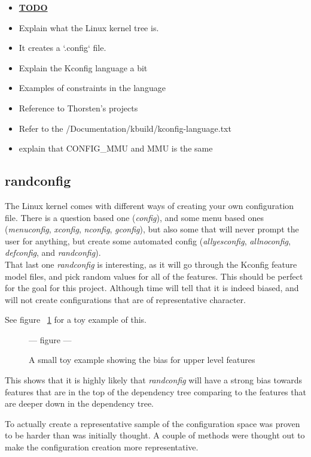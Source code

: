 \documentclass[a4paper,11pt]{article}
\newcommand{\figa}{
    \begin{figure}[!htpb]
    \centering
}
\newcommand{\figb}[2]{
    \caption{#1}
    \label{#2}
    \end{figure}
}
\begin{document}
\begin{itemize}
    \item \underline{\textbf{TODO}}
    \item Explain what the Linux kernel tree is.
    \item It creates a `.config` file.
    \item Explain the Kconfig language a bit
    \item Examples of constraints in the language
    \item Reference to Thorsten's projects
    \item Refer to the /Documentation/kbuild/kconfig-language.txt
    \item explain that CONFIG\_MMU and MMU is the same
\end{itemize}

\subsection{randconfig}

The Linux kernel comes with different ways of creating your own configuration 
file. There is a question based one (\emph{config}), and some menu based ones 
(\emph{menuconfig}, \emph{xconfig}, \emph{nconfig}, \emph{gconfig}), but also 
some that will never prompt the user for anything, but create some automated 
config (\emph{allyesconfig}, \emph{allnoconfig}, \emph{defconfig}, and 
\emph{randconfig}).
\\

That last one \emph{randconfig} is interesting, as it will go through the 
Kconfig feature model files, and pick random values for all of the features. 
This should be perfect for the goal for this project. Although time will tell 
that it is indeed biased, and will not create configurations that are of 
representative character. 

See figure ~\ref{randconfigtoy} for a toy example of this.

\figa
    --- figure ---
\figb{A small toy example showing the bias for upper level 
    features}{randconfigtoy}


This shows that it is highly likely that \emph{randconfig} will have a strong 
bias towards features that are in the top of the dependency tree comparing to 
the features that are deeper down in the dependency tree. 

To actually create a representative sample of the configuration space was 
proven to be harder than was initially thought. A couple of methods were 
thought out to make the configuration creation more representative. \\
\end{document}
